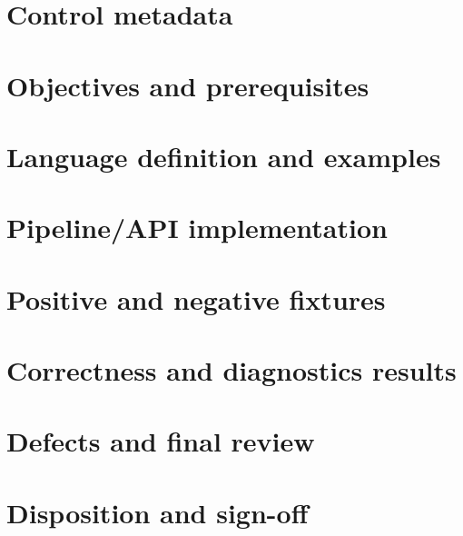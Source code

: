 \documentclass[11pt,letterpaper]{article}
\begin{document}
\makedoctitle\makedocsummary
\section{Control metadata}
\section{Objectives and prerequisites}
\section{Language definition and examples}
\section{Pipeline/API implementation}
\section{Positive and negative fixtures}
\section{Correctness and diagnostics results}
\section{Defects and final review}
\section{Disposition and sign-off}
\end{document}
